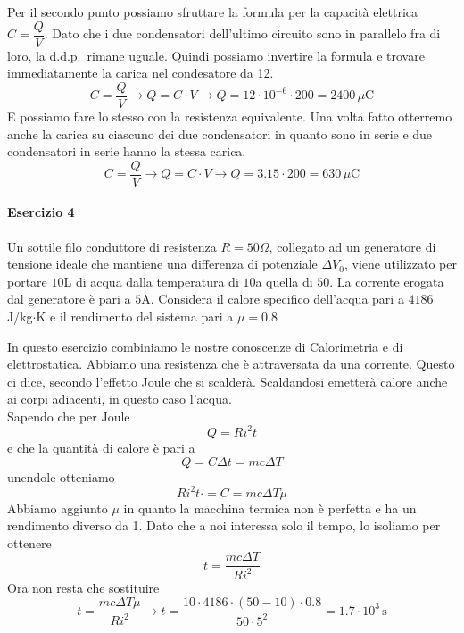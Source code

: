 Per il secondo punto possiamo sfruttare la formula per la capacità elettrica $C = \dfrac{Q}{V}$. Dato
che i due condensatori dell'ultimo circuito sono in parallelo fra di loro, la d.d.p.~rimane uguale. 
Quindi possiamo invertire la formula e trovare immediatamente la carica nel condesatore da 12.
\begin{equation*}
  C = \frac{Q}{V} \rightarrow Q = C\cdot V \rightarrow Q = 12\cdot10^{-6}\cdot200 =
  \boxed{2400\,\mu\text{C}}
\end{equation*}
E possiamo fare lo stesso con la resistenza equivalente. Una volta fatto otterremo anche la carica su 
ciascuno dei due condensatori in quanto sono in serie e due condensatori in serie hanno la stessa 
carica.
\begin{equation*}
  C = \frac{Q}{V} \rightarrow Q = C\cdot V \rightarrow Q = 3.15\cdot200 = \boxed{630\,\mu\text{C}}
\end{equation*}

\paragraph{Esercizio 4}
Un sottile filo conduttore di resistenza $R = 50\Omega$, collegato ad un generatore di tensione
ideale che mantiene una differenza di potenziale $\Delta V_0$, viene utilizzato per portare
$10$L di acqua dalla temperatura di $10$\textdegree a quella di $50$\textdegree. La corrente
erogata dal generatore è pari a $5$A. Considera il calore specifico dell'acqua pari a 
$4186$ J/kg$\cdot$K e il rendimento del sistema pari a $\mu=0.8$
\divisor

In questo esercizio combiniamo le nostre conoscenze di Calorimetria e di elettrostatica. Abbiamo
una resistenza che è attraversata da una corrente. Questo ci dice, secondo l'effetto Joule che 
si scalderà. Scaldandosi emetterà calore anche ai corpi adiacenti, in questo caso l'acqua.\\
Sapendo che per Joule
\begin{equation*}
  Q = Ri^2t
\end{equation*}
e che la quantità di calore è pari a
\begin{equation*}
  Q = C\Delta t = mc\Delta T
\end{equation*}
unendole otteniamo
\begin{equation*}
  Ri^2t\cdot = C= mc\Delta T\mu
\end{equation*}
Abbiamo aggiunto $\mu$ in quanto la macchina termica non è perfetta e ha un rendimento diverso da 
1. Dato che a noi interessa solo il tempo, lo isoliamo per ottenere
\begin{equation*}
  t = \frac{mc\Delta T}{Ri^2} 
\end{equation*}
Ora non resta che sostituire
\begin{equation*}
  t = \frac{mc\Delta T\mu}{Ri^2} \rightarrow t =  \frac{10\cdot4186\cdot(50-10)\cdot0.8}{50\cdot5^2}
  = \boxed{1.7\cdot10^3\,\text{s}}
\end{equation*}


